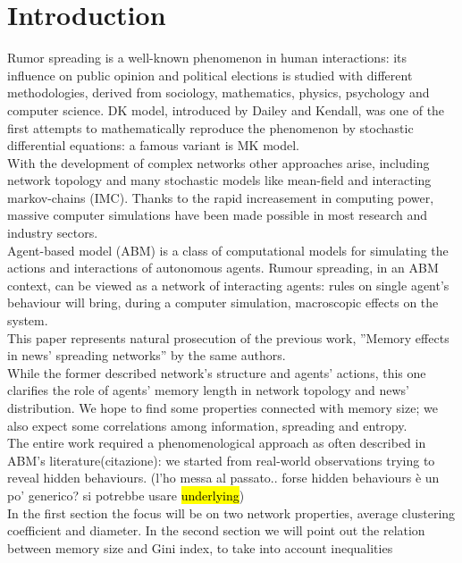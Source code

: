 \section{Introduction} \label{introduction}
Rumor spreading is a well-known phenomenon in human interactions:
its influence on public opinion\cite{publicoprumsp} and political
elections\cite{politicalrumsp} is studied with different
methodologies, derived from sociology, mathematics,
physics, psychology and computer science.
DK model,\cite{DKmodel} introduced by Dailey and Kendall, was one of
the first attempts to mathematically reproduce the phenomenon by
stochastic differential equations: a famous variant is MK
model.\cite{MKmodel}\\
With the development of complex networks other approaches arise,
including network topology and many stochastic models
like mean-field\cite{meanfield} and interacting markov-chains\cite{IMC} (IMC).
Thanks to the rapid increasement in computing power,
massive computer simulations have been made possible in
most research and industry sectors.\\
Agent-based model (ABM) is a class of computational models for
simulating the actions and interactions of autonomous
agents.\cite{Agentbased}
Rumour spreading, in an ABM context, can be viewed as a network
of interacting agents: rules on single agent's behaviour
will bring, during a computer simulation, macroscopic
effects on the system.\\
This paper represents natural prosecution of the previous work,
''Memory effects in news' spreading networks'' by the same
authors.\cite{ourpaper}\\
While the former described network's structure and agents' actions,
this one clarifies the role of agents' memory length in network
topology and news' distribution.
We hope to find some properties connected with memory size;
we also expect some correlations among information,
spreading and entropy.\\
The entire work required a phenomenological approach as often described in
ABM's literature(citazione): we started from real-world observations trying
to reveal hidden behaviours.
(l'ho messa al passato.. forse hidden behaviours è un po' generico?
si potrebbe usare \hl{underlying})\\
 In the first section the focus will be on two network properties, average clustering coefficient
and diameter. In the second section we will point out the relation
between memory size and Gini index, to take into account inequalities
